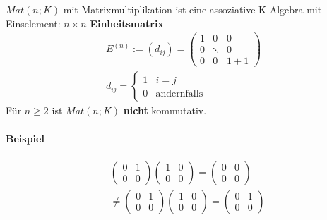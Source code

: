\documentclass[11pt]{report}
\newcommand*\f[1] {\textbf{#1}}
\begin{document}
$Mat(n;K)$ mit Matrixmultiplikation ist eine assoziative K-Algebra mit Einselement: $n\times n$ \f{Einheitsmatrix}
\begin{align}
 E^{(n)} := (d_{ij}) = \begin{pmatrix} 1 & 0 & 0 \\ 0 & \ddots & 0 \\ 0 & 0 & 1+1\end{pmatrix} \\
 d_{ij} = \left\{ \begin{matrix} 1 & i=j \\ 0 & \text{andernfalls} \end{matrix} \right.
\end{align}
Für $n \geq 2$ ist $Mat(n;K)$ \f{nicht} kommutativ.

\paragraph{Beispiel}
\begin{align}
&\begin{pmatrix} 0 & 1 \\ 0 & 0\end{pmatrix} \begin{pmatrix} 1 & 0 \\ 0 & 0 \end{pmatrix} = \begin{pmatrix} 0 & 0 \\ 0 & 0\end{pmatrix} \\
&\neq  \begin{pmatrix} 0 & 1 \\ 0 & 0\end{pmatrix} \begin{pmatrix} 1 & 0 \\ 0 & 0 \end{pmatrix} = \begin{pmatrix} 0 & 1 \\ 0 & 0\end{pmatrix}
\end{align}
\end{document}
